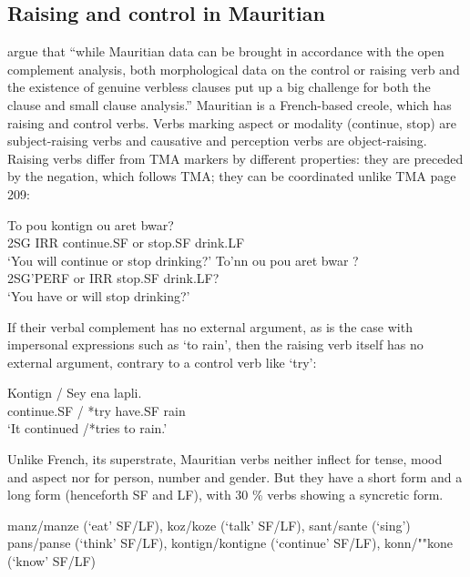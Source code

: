 \documentclass[output=paper]{langsci/langscibook}
\begin{document}
\subsection{Raising and control in Mauritian}

\citet[]{HenriandLaurens2011} argue that ``while Mauritian data can be brought in accordance with the open complement analysis, both morphological data on the control or raising verb and the existence of genuine verbless clauses put up a big challenge for both the clause and small clause analysis.''
Mauritian is a French-based creole, which has raising and control verbs. Verbs marking aspect or modality (continue, stop) are subject-raising verbs and causative and perception verbs are object-raising. Raising verbs differ from TMA markers by different properties: they are preceded by the negation, which follows TMA; they can be coordinated unlike TMA \citep{HenriandLaurens2011} page 209:

\begin{exe}
\ex \gll To pou kontign ou aret bwar? \\
2SG IRR continue.SF or stop.SF drink.LF\\
\glt  `You will continue or stop drinking?'
\ex \gll *To’nn ou pou aret bwar ? \\
 2SG’PERF or IRR stop.SF drink.LF?\\
 \glt  `You have or will stop drinking?'
 \end{exe}
 
If their verbal complement has no external argument, as is the case with impersonal expressions such as  ‘to rain’, then the raising verb itself has no external argument, contrary to a control verb like  `try':

\begin{exe}
\ex \gll Kontign / Sey ena lapli. \\
continue.SF / *try have.SF rain \\
\glt ‘It continued /*tries to rain.’
\end{exe}

Unlike French, its superstrate, Mauritian verbs neither inflect for tense, mood and aspect nor for person, number and
gender. But they have a short form and a long form (henceforth SF and LF), with 30 \% verbs showing a syncretic form.

\begin{exe}
\ex \begin{xlist}
\ex manz/manze (`eat' SF/LF), koz/koze (`talk' SF/LF), sant/sante (`sing')
\ex pans/panse (`think' SF/LF), kontign/kontigne (`continue' SF/LF), konn/""kone (`know' SF/LF)
\end{xlist}
\end{exe}
\end{document}
